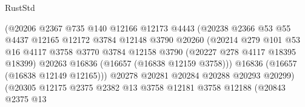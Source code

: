 \begin{lexlean}{RustStd}
\begin{coremodule}
                                      (@20206
                                        @2367
                                        @735
                                        @140
                                        @12166
                                        @12173
                                        @4443
                                        (@20238
                                          @2366
                                          @53
                                          @55
                                          @4437
                                          @12165
                                          @12172
                                          @3784
                                          @12148
                                          @3790
                                          @20260
                                          (@20214
                                            @279
                                            @101
                                            @53
                                            @16
                                            @4117
                                            @3758
                                            @3770
                                            @3784
                                            @12158
                                            @3790
                                            (@20227 @278 @4117 @18395 @18399)
                                            @20263
                                            @16836
                                            (@16657 (@16838 @12159 @3758)))
                                          @16836
                                          (@16657 (@16838 @12149 @12165)))
                                        @20278
                                        @20281
                                        @20284
                                        @20288
                                        @20293
                                        @20299)
                                      (@20305
                                        @12175
                                        @2375
                                        @2382
                                        @13
                                        @3758
                                        @12181
                                        @3758
                                        @12188
                                        (@20843
                                          @2375
                                          @13

\end{coremodule}
\end{lexlean}
